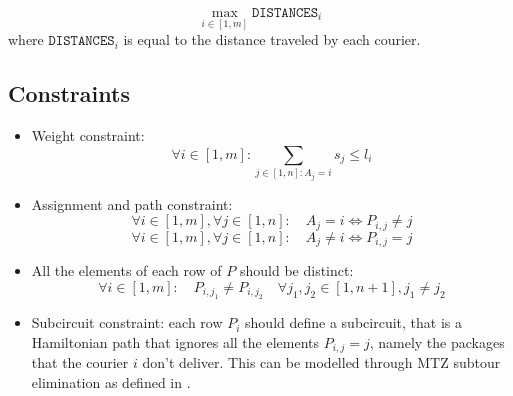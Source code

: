 \[ \max_{i \in [1, m]} \texttt{DISTANCES}_i  \]
where $\texttt{DISTANCES}_i$ is equal to the distance traveled by each courier.

\subsection{Constraints}

\begin{itemize}
    \item Weight constraint: 
    \begin{equation}
        \forall i \in [1, m]: \sum_{j \in [1, n]: A_j = i} s_j \leq l_i 
    \end{equation}

    \item Assignment and path constraint:
    \begin{equation}
        \forall i \in [1, m], \forall j \in [1, n]: \quad A_j = i \Longleftrightarrow P_{i,j} \neq j
    \end{equation}
    \begin{equation}
        \forall i \in [1, m], \forall j \in [1, n]: \quad A_j \neq i \Longleftrightarrow P_{i,j} = j
    \end{equation}

    \item All the elements of each row of $P$ should be distinct:
    \begin{equation}
        \forall i \in [1, m]: \quad P_{i,j_1} \neq P_{i,j_2} \quad \forall j_1,j_2 \in [1, n+1], j_1 \neq j_2 
    \end{equation}



    \item Subcircuit constraint: each row $P_i$ should define a subcircuit, that is a Hamiltonian path that ignores all the elements $P_{i,j} = j$, namely the packages that the courier $i$ don't deliver. This can be modelled through MTZ subtour elimination as defined in .

\end{itemize}



